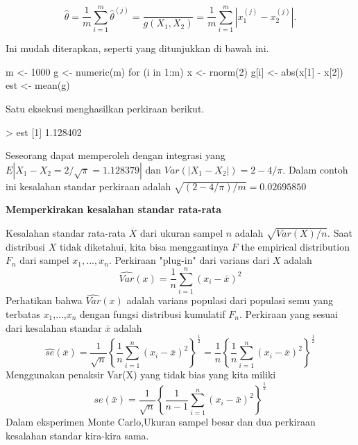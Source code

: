 \documentclass[a4paper,12pt]{article}
\theoremstyle{definition}
\begin{document}
\begin{equation*}
    \hat{\theta} = \frac{1}{m}\sum_{i=1}^{m}\hat{\theta} ^{(j)}=\frac{}{g(X_{1},X_{2})}=\frac{1}{m}\sum_{i=1}^{m}\left | x^{(j)}_{1}-x^{(j)}_{2} \right |.
\end{equation*}

Ini mudah diterapkan, seperti yang ditunjukkan di bawah ini.

\begin{spverbatim}
    m <- 1000
    g <- numeric(m)
    for (i in 1:m) {
         x <- rnorm(2)
         g[i] <- abs(x[1] - x[2])
    }
    est <- mean(g)
\end{spverbatim}
Satu eksekusi menghasilkan perkiraan berikut.

 \begin{spverbatim}
     > est
     [1] 1.128402
 \end{spverbatim}

Seseorang dapat memperoleh dengan integrasi yang $E\left | X_{1}-X_{2} = 2/\sqrt{\pi}= 1.128379 \right |$ dan $Var \left ( \left | X_{1}-X_{2} \right |\right ) = 2-4/\pi.$  Dalam contoh ini kesalahan standar perkiraan adalah $\sqrt{(2-4/\pi )/m}=0.02695850$ 

\textbf{Memperkirakan kesalahan standar rata-rata}

Kesalahan standar rata-rata $\overline{X}$ dari ukuran sampel $n$ adalah $\sqrt{Var(X)/n}$. Saat distribusi $X$ tidak diketahui, kita bisa menggantinya $F$ the empirical distribution $F_{n}$ dari sampel $x_{1},...,x_{n}$. Perkiraan "plug-in" dari varians
dari $X$ adalah
\begin{equation}
    \widehat{Var}(x)=\frac{1}{n}\sum_{i=1}^{n}(x_{i}-\bar{x})^{2}
\end{equation}
Perhatikan bahwa $ \widehat{Var}(x)$ adalah varians populasi dari populasi semu yang terbatas {$x_{1}$,...,$x_{n}$} dengan fungsi distribusi kumulatif $F_{n}$. Perkiraan yang sesuai dari kesalahan standar $\bar{x}$ adalah 
\begin{equation}
    \hat{se}(\bar{x})=\frac{1}{\sqrt{n}}\left \{ \frac{1}{n}\sum_{i=1}^{n}(x_{i}-\bar{x})^{2}\right \}^{\frac{1}{2}}= \frac{1}{n}\left \{ \frac{1}{n}\sum_{i=1}^{n}(x_{i}-\bar{x})^{2}\right\}^{\frac{1}{2}}
\end{equation}
Menggunakan penaksir Var(X) yang tidak bias yang kita miliki
\begin{equation}
    \hat{se}(\bar{x})=\frac{1}{\sqrt{n}}\left \{ \frac{1}{n-1}\sum_{i=1}^{n}(x_{i}-\bar{x})^{2}\right \}^{\frac{1}{2}}
\end{equation}
Dalam eksperimen Monte Carlo,Ukuran sampel besar dan dua perkiraan kesalahan standar kira-kira sama.
\end{document}
